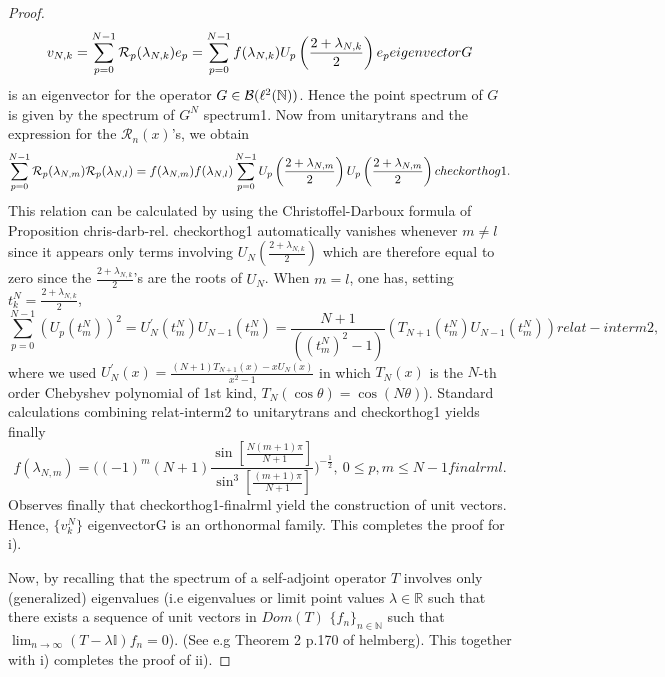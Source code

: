\documentclass[10pt]{book}
\theoremstyle{break}
\begin{document}
\begin{proof}
\begin{equation*}
v_{N,k}=\sum_{p=0}^{N-1}{\cal{R}}_{p}(\lambda_{N,k})e_p=\sum_{p=0}^{N-1}f(\lambda_{N,k})U_p\left({\frac{2+\lambda_{N,k}}{2}}\right)e_p{eigenvectorG}
\end{equation*}
is an eigenvector for the operator $G\in{\cal{B}}(\ell^2(\mathbb{N}))$. Hence the point spectrum of $G$ is given by the spectrum of $G^N$ {spectrum1}. Now from {unitarytrans} and the expression for the $\mathcal{R}_n(x)$'s, we obtain 
\begin{equation*}
\sum_{p=0}^{N-1}{\cal{R}}_p(\lambda_{N,m}){\cal{R}}_p(\lambda_{N,l})=f(\lambda_{N,m})f(\lambda_{N,l})\sum_{p=0}^{N-1}
U_p\left(\frac{2+\lambda_{N,m}}{2}\right)U_p\left(\frac{2+\lambda_{N,m}}{2}\right){checkorthog1}.
\end{equation*}
This relation can be calculated by using the Christoffel-Darboux formula of Proposition {chris-darb-rel}. {checkorthog1} automatically vanishes whenever $m\ne l$ since it appears only terms involving $U_N({\frac{2+\lambda_{N,k}}{2}})$ which are therefore equal to zero since the ${\frac{2+\lambda_{N,k}}{2}}$'s are the roots of $U_N$. When $m=l$, one has, setting $t^N_k={\frac{2+\lambda_{N,k}}{2}}$,
\begin{equation*}
\sum_{p=0}^{N-1}(U_p(t^N_m))^2=U_N^\prime(t^N_m)U_{N-1}(t^N_m)={\frac{N+1}{((t^N_m)^2-1)}}(T_{N+1}(t^N_m)U_{N-1}(t^N_m)){relat-interm2},
\end{equation*}
where we used $U^\prime_N(x)={\frac{(N+1)T_{N+1}(x)-xU_N(x) }{x^2-1 }}$ in which $T_N(x)$ is the $N$-th order Chebyshev polynomial of 1st kind, $T_N(\cos\theta)=\cos(N\theta)$). Standard calculations combining {relat-interm2} to {unitarytrans} and {checkorthog1} yields finally
\begin{equation*}
f(\lambda_{N,m})=\bigg((-1)^m(N+1){\frac{ \sin[{\frac{N(m+1)\pi }{N+1 }}  ]}{\sin^3[{\frac{(m+1)\pi }{N+1 }} ] }} \bigg)^{-{\frac12}},\ 0\le p,m\le N-1{finalrml}.
\end{equation*}
Observes finally that {checkorthog1}-{finalrml} yield the construction of unit vectors. Hence, $\{v^N_k\}$ {eigenvectorG} is an orthonormal family. This completes the proof for i). \par
Now, by recalling that the spectrum of a self-adjoint operator $T$ involves only (generalized) eigenvalues (i.e eigenvalues or limit point values $\lambda\in\mathbb{R}$ such that there exists a sequence of unit vectors in $Dom(T)$ $\{f_n\}_{n\in\mathbb{N}}$ such that $\lim_{n\to\infty}(T-\lambda\mathbb{I})f_n=0$). (See e.g Theorem 2 p.170 of {helmberg}). This together with i) completes the proof of ii).
\end{proof}
\end{document}
